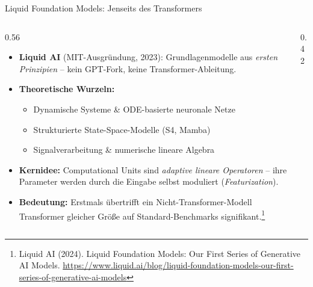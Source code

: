\documentclass[aspectratio=1610, xcolor=dvipsnames, 9pt]{beamer}
\begin{document}
\begin{frame}{Liquid Foundation Models: Jenseits des Transformers}
  \begin{columns}
    \begin{column}{0.56\textwidth}
      \begin{itemize}
        \item \textbf{Liquid AI} (MIT-Ausgründung, 2023): Grundlagenmodelle aus \emph{ersten Prinzipien} -- kein GPT-Fork, keine Transformer-Ableitung.
        \item \textbf{Theoretische Wurzeln:}
          \begin{itemize}
            \item Dynamische Systeme \& ODE-basierte neuronale Netze
            \item Strukturierte State-Space-Modelle (S4, Mamba)
            \item Signalverarbeitung \& numerische lineare Algebra
          \end{itemize}
        \item \textbf{Kernidee:} Computational Units sind \emph{adaptive lineare Operatoren} -- ihre Parameter werden durch die Eingabe selbst moduliert (\emph{Featurization}).
        \item \textbf{Bedeutung:} Erstmals übertrifft ein Nicht-Transformer-Modell Transformer gleicher Größe auf Standard-Benchmarks signifikant.\footnote{Liquid AI (2024). Liquid Foundation Models: Our First Series of Generative AI Models. \url{https://www.liquid.ai/blog/liquid-foundation-models-our-first-series-of-generative-ai-models}}
      \end{itemize}
    \end{column}
    \begin{column}{0.42\textwidth}
      \centering
    \end{column}
  \end{columns}
\end{frame}
\end{document}
